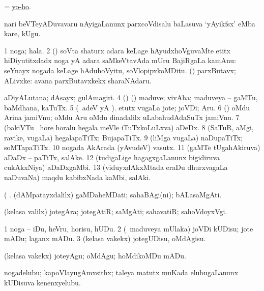 \bentry
{} 
\gl{\BAavayx} 
\bmng
= \hyperlink{yo-ho}{yo-ho}.
\emng
\eentry

\bentry
{} 
\gl{\BAavayx} 
\bmng
nari beVTeyADuvavaru nAyigaLanunx parxcoVdisalu baLasuva `yAyikfsx' eMba kare, kUgu.
\emng
\eentry

\bentry
{} 
\gl{\nA} 
\bmng
\bnum
\num{1} noga; hala. 
\num{2} (\roVca) soVta shaturx adara keLage hAyudxhoVguvaMte etitx hiDiyutitxdadx noga yA adara saMkeVtavAda mUru BajiRgaLa kamAnu:  seYnayx nogada keLage hAduhoVyitu, soVlopipxkoMDitu. 
 (\rUpa) 
\banum
{} parxButavx; ALivxke:  avana parxButavxkekx sharaNAdaru. 

 aDiyALutana; dAsayx; gulAmagiri. 
\eanum
\numie
\num{4} (\rUpa) (\kanmu) maduve; vivAha; maduveya -- gaMTu, baMdhana, kaTuTx. 
\num{5} (\bava\ adeV yA ). etutx \mo vugaLa jote; joVDi; Aru. 
\num{6} (\pArxparx) oMdu Arina jamiVnu; oMdu Aru oMdu dinadalilx uLabahudAdaSuTx jamiVnu. 
\num{7} (bakiVTu \mo\ hore horalu hegala meVle iTuTxkoLuLxva) aDeDx. 
\num{8} (SaTuR, aMgi, ravike, \mo vugaLa) hegalapaTiTx; BujapaTiTx. 
\num{9} (liMga \mo vugaLa) naDupaTiTx; soMTapaTiTx. 
\num{10} nogada AkArada (yAvudeV) vasutx. 
\num{11} (gaMTe tUgahAkiruva) aDaDx -- paTiTx, salAke. 
\num{12} (tudigaLige hagagxgaLanunx bigidiruva cukAkxNiya) aDaDxgaMbi. 
\num{13} (viduyxdAkxMtada eraDu dhurxvagaLa naDuvaNa) maqdu kabibxNada kaMbi, salAki.
\enum
\emng

\noindent                               
\gl{\pagu} 
\bmng
{} (  . 
\banum
{} (dAMpatayxdalilx) gaMDaheMDati; sahaBAgi(ni); bALasaMgAti.  

  (kelasa \mo valilx) jotegAra; jotegAtiR; saMgAti; sahavatiR; sahoVdoyxVgi.
\eanum
\emng
\eentry

\bentry
{} 
\gl{\sakirx} 
\bmng
\bnum
\num{1} noga -- iDu, heVru, horisu, hUDu. 
\num{2} (\kanmu\ maduveya mUlaka) joVDi kUDisu; jote mADu; laganx mADu. 
\num{3} (kelasa \mo vakekx) jotegUDisu, oMdAgisu.
\enum
\emng

\noindent
\gl{\akirx} 
\bmng
(kelasa \mo vakekx) joteyAgu; oMdAgu; hoMdikoMDu mADu.
\emng
\eentry

\bentry
{} 
\gl{\nA} 
\bmng
nogadelubu; kapoVlayugAmxsithx; taleya matutx muKada elubugaLanunx kUDisuva kenenxyelubu.
\emng
\eentry

